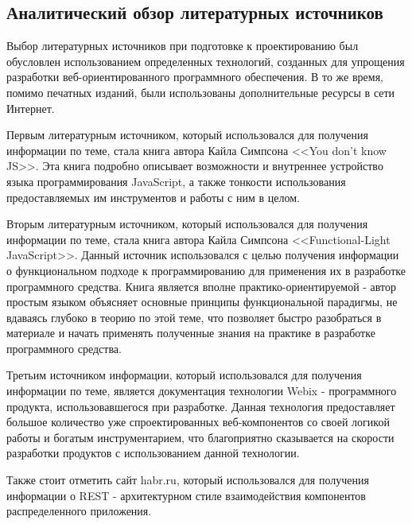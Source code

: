 \subsection{Аналитический обзор литературных источников}
\label{sec:analysis:literature}

Выбор литературных источников при подготовке к проектированию был обусловлен использованием определенных технологий, созданных для упрощения разработки веб-ориентированного программного обеспечения. В то же время, помимо печатных изданий, были использованы дополнительные ресурсы в сети Интернет.

Первым литературным источником, который использовался для получения информации по теме, стала книга автора Кайла Симпсона <<You don’t know JS>>. Эта книга подробно описывает возможности и внутреннее устройство языка программирования JavaScript, а также тонкости использования предоставляемых им инструментов и работы с ним в целом. 

Вторым литературным источником, который использовался для получения информации по теме, стала книга автора Кайла Симпсона <<Functional-Light JavaScript>>. Данный источник использовался с целью получения информации о функциональном подходе к программированию для применения их в разработке программного средства. Книга является вполне практико-ориентируемой - автор простым языком объясняет основные принципы функциональной парадигмы, не вдаваясь глубоко в теорию по этой теме, что позволяет быстро разобраться в материале и начать применять полученные знания на практике в разработке программного средства.

Третьим источником информации, который использовался для получения информации по теме, является документация технологии Webix - программного продукта, использовавшегося при разработке. Данная технология предоставляет большое количество уже спроектированных веб-компонентов со своей логикой работы и богатым инструментарием, что благоприятно сказывается на скорости разработки продуктов с использованием данной технологии.

Также стоит отметить сайт habr.ru, который использовался для получения информации о REST - архитектурном стиле взаимодействия компонентов распределенного приложения.